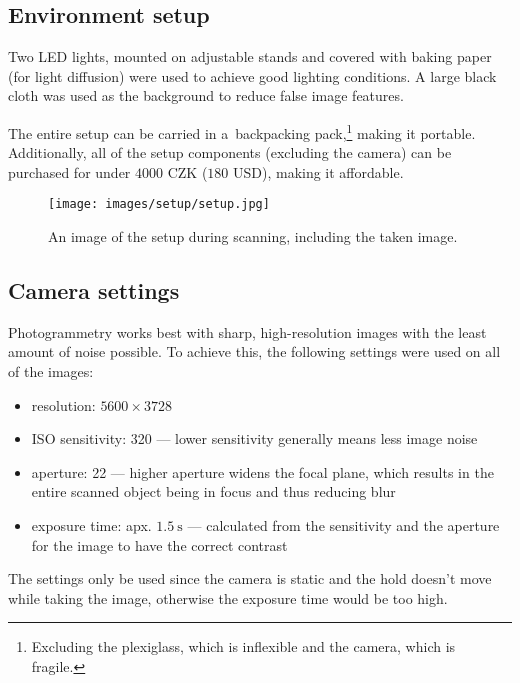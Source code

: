 \subsection{Environment setup}
Two LED lights, mounted on adjustable stands and covered with baking paper (for light diffusion) were used to achieve good lighting conditions.
A large black cloth was used as the background to reduce false image features.

The entire setup can be carried in a~backpacking pack,\footnote{Excluding the plexiglass, which is inflexible and the camera, which is fragile.} making it portable.
Additionally, all of the setup components (excluding the camera) can be purchased for under $4000$ CZK ($180$ USD), making it affordable.

\begin{figure}
	\centering
	\texttt{[image: images/setup/setup.jpg]}
	\caption{An image of the setup during scanning, including the taken image.}
	\label{fig:setup}
\end{figure}

\subsection{Camera settings}\label{sec:camsettings}
Photogrammetry works best with sharp, high-resolution images with the least amount of noise possible.
To achieve this, the following settings were used on all of the images:
\begin{itemize}
	\item resolution: $5600 \times 3728$
	\item ISO sensitivity: 320 --- lower sensitivity generally means less image noise
	\item aperture: 22 --- higher aperture widens the focal plane, which results in the entire scanned object being in focus and thus reducing blur
	\item exposure time: apx. $\SI{1.5}{\second}$ --- calculated from the sensitivity and the aperture for the image to have the correct contrast
\end{itemize}

The settings only be used since the camera is static and the hold doesn't move while taking the image, otherwise the exposure time would be too high.

